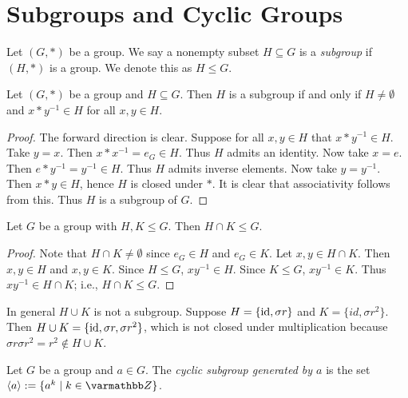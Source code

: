 \section{Subgroups and Cyclic Groups}
    \begin{definition}
        Let $(G,\ast)$ be a group. We say a nonempty subset $H \subseteq G$ is a \textit{subgroup} if $(H,\ast)$ is a group. We denote this as $H \leq G$.
    \end{definition}

    \begin{proposition}
        Let $(G,\ast)$ be a group and $H \subseteq G$. Then $H$ is a subgroup if and only if $H \neq \emptyset$ and $x\ast y^{-1} \in H$ for all $x,y \in H$.
    \end{proposition}
        \begin{proof}
            The forward direction is clear. Suppose for all $x,y \in H$ that $x \ast y^{-1} \in H$. Take $y = x$. Then $x \ast x^{-1} = e_G \in H$. Thus $H$ admits an identity. Now take $x = e$. Then $e \ast y^{-1} = y^{-1} \in H$. Thus $H$ admits inverse elements. Now take $y = y^{-1}$. Then $x \ast y \in H$, hence $H$ is closed under $\ast$. It is clear that associativity follows from this. Thus $H$ is a subgroup of $G$.
        \end{proof}

    \begin{proposition}
        Let $G$ be a group with $H,K \leq G$. Then $H \cap K \leq G$.
    \end{proposition}
        \begin{proof}
            Note that $H \cap K \neq \emptyset$ since $e_G \in H$ and $e_G \in K$. Let $x,y \in H \cap K$. Then $x,y \in H$ and $x,y \in K$. Since $H \leq G$, $xy^{-1} \in H$. Since $K \leq G$, $xy^{-1} \in K$. Thus $xy^{-1} \in H \cap K$; i.e., $H \cap K \leq G$. 
        \end{proof}

    In general $H \cup K$ is not a subgroup. Suppose $H = \{ \operatorname{id} , \sigma r \}$ and $K = \{id , \sigma r^2 \}$. Then $H \cup K = \{\operatorname{id}, \sigma r, \sigma r^2\}$, which is not closed under multiplication because $\sigma r \sigma r^2 = r^2 \not\in H \cup K$.

    \begin{definition}
        Let $G$ be a group and $a \in G$. The \textit{cyclic subgroup generated by $a$} is the set $\langle a \rangle := \{a^k \mid k \in \bfZ\}$.
    \end{definition}

